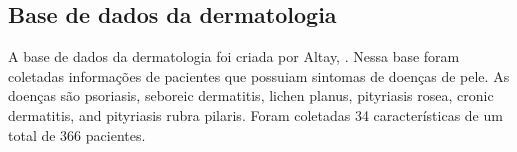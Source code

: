 \documentclass[ 
	article,			%
	11pt,				%
	oneside,			%
	a4paper,			%
	english,			%
	brazil,				%
	]{abntex2}
\begin{document}
\subsection{Base de dados da dermatologia}
A base de dados da dermatologia foi criada por Altay, \cite{gvenir1998learning}.
Nessa base foram coletadas informações de pacientes que possuiam sintomas de
doenças de pele. As doenças são psoriasis, seboreic dermatitis, lichen planus,
pityriasis rosea, cronic dermatitis, and pityriasis rubra pilaris. Foram
coletadas 34 características de um total de 366 pacientes.
% 
% 
% 
\end{document}
